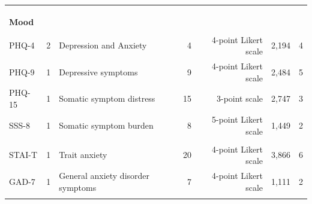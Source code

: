 \begin{table}
\begin{tabular*}{\linewidth}{@{\extracolsep{\fill}}lrlrrcc}
{\cellcolor[HTML]{FFF8E1}{BRS}} & {\cellcolor[HTML]{FFF8E1}{1}} & {\cellcolor[HTML]{FFF8E1}{Body responsiveness}} & {\cellcolor[HTML]{FFF8E1}{4}} & {\cellcolor[HTML]{FFF8E1}{7-point Likert scale}} & {\cellcolor[HTML]{FFF8E1}{802}} & {\cellcolor[HTML]{FFF8E1}{1}} \\ 
{\cellcolor[HTML]{FFF8E1}{EDI-2 (interoceptive awareness subscale)}} & {\cellcolor[HTML]{FFF8E1}{1}} & {\cellcolor[HTML]{FFF8E1}{Interoceptive awareness}} & {\cellcolor[HTML]{FFF8E1}{10}} & {\cellcolor[HTML]{FFF8E1}{4-point scale}} & {\cellcolor[HTML]{FFF8E1}{513}} & {\cellcolor[HTML]{FFF8E1}{1}} \\ 
{\cellcolor[HTML]{FFF8E1}{FFMQ (observing and describing subscales)}} & {\cellcolor[HTML]{FFF8E1}{2}} & {\cellcolor[HTML]{FFF8E1}{Mindfulness (observing and describing)}} & {\cellcolor[HTML]{FFF8E1}{16}} & {\cellcolor[HTML]{FFF8E1}{5-point Likert scale}} & {\cellcolor[HTML]{FFF8E1}{522}} & {\cellcolor[HTML]{FFF8E1}{1}} \\ 
{\bfseries Mood} &  &  &  &  &  &  \\ 
{\cellcolor[HTML]{FFF8E1}{BDI-II}} & {\cellcolor[HTML]{FFF8E1}{2}} & {\cellcolor[HTML]{FFF8E1}{Depressive symptoms severity}} & {\cellcolor[HTML]{FFF8E1}{21}} & {\cellcolor[HTML]{FFF8E1}{4-point scale}} & {\cellcolor[HTML]{FFF8E1}{836}} & {\cellcolor[HTML]{FFF8E1}{1}} \\ 
PHQ-4 & 2 & Depression and Anxiety & 4 & 4-point Likert scale & 2,194 & 4 \\ 
PHQ-9 & 1 & Depressive symptoms & 9 & 4-point Likert scale & 2,484 & 5 \\ 
PHQ-15 & 1 & Somatic symptom distress & 15 & 3-point scale & 2,747 & 3 \\ 
SSS-8 & 1 & Somatic symptom burden & 8 & 5-point Likert scale & 1,449 & 2 \\ 
{\cellcolor[HTML]{FFF8E1}{MFQ}} & {\cellcolor[HTML]{FFF8E1}{1}} & {\cellcolor[HTML]{FFF8E1}{Mood and affect}} & {\cellcolor[HTML]{FFF8E1}{13}} & {\cellcolor[HTML]{FFF8E1}{3-point scale}} & {\cellcolor[HTML]{FFF8E1}{106}} & {\cellcolor[HTML]{FFF8E1}{1}} \\ 
STAI-T & 1 & Trait anxiety & 20 & 4-point Likert scale & 3,866 & 6 \\ 
GAD-7 & 1 & General anxiety disorder symptoms & 7 & 4-point Likert scale & 1,111 & 2 \\ 
{\cellcolor[HTML]{FFF8E1}{DASS-21 (depression and anxiety subscales)}} & {\cellcolor[HTML]{FFF8E1}{2}} & {\cellcolor[HTML]{FFF8E1}{Depression and anxiety}} & {\cellcolor[HTML]{FFF8E1}{14}} & {\cellcolor[HTML]{FFF8E1}{4-point Likert scale}} & {\cellcolor[HTML]{FFF8E1}{519}} & {\cellcolor[HTML]{FFF8E1}{1}} \\ 

\end{tabular*}
\end{table}
